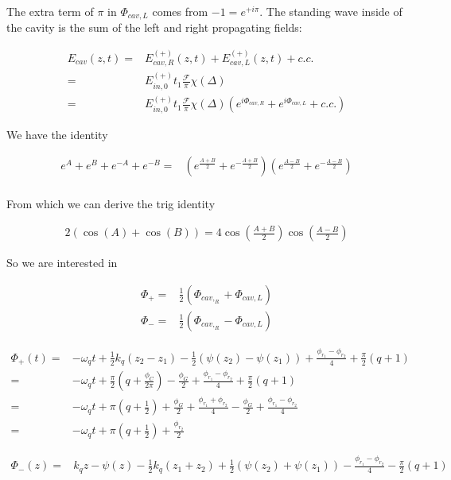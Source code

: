 \documentclass[12pt]{article}
\begin{document}
The extra term of $\pi$ in $\Phi_{cav,L}$ comes from $-1 = e^{+i\pi}$. 
The standing wave inside of the cavity is the sum of the left and right propagating fields:

\begin{align}
E_{cav}(z,t) =& E_{cav,R}^{(+)}(z,t) + E_{cav,L}^{(+)}(z,t) + c.c.\\
=& E_{in,0}^{(+)}t_1\frac{\mathcal{F}}{\pi}\chi(\Delta)\\
=& E_{in,0}^{(+)}t_1\frac{\mathcal{F}}{\pi}\chi(\Delta)\left(e^{i\Phi_{cav,R}} + e^{i\Phi_{cav,L}} + c.c.\right)
\end{align}

We have the identity

\begin{align}
e^A + e^B + e^{-A} + e^{-B} =& \left(e^{\frac{A+B}{2}} + e^{-\frac{A+B}{2}}\right)\left(e^{\frac{A-B}{2}} + e^{-\frac{A-B}{2}}\right)\\
\end{align}

From which we can derive the trig identity

\begin{align}
2(\cos(A) + \cos(B)) = 4\cos\left(\frac{A+B}{2}\right)\cos\left(\frac{A-B}{2}\right)
\end{align}

So we are interested in

\begin{align}
\Phi_+ =& \frac{1}{2}\left(\Phi_{cav,_R} + \Phi_{cav,L}\right)\\
\Phi_- =& \frac{1}{2}\left(\Phi_{cav,_R} - \Phi_{cav,L}\right)
\end{align}

\begin{align}
\Phi_+(t) =& -\omega_q t + \frac{1}{2}k_q(z_2-z_1) - \frac{1}{2}(\psi(z_2)-\psi(z_1)) + \frac{\phi_{r_1} - \phi_{r_2}}{4} + \frac{\pi}{2}(q+1)\\
=& -\omega_q t + \frac{\pi}{2}\left(q + \frac{\phi_C}{2\pi}\right) -\frac{\phi_G}{2} + \frac{\phi_{r_1} - \phi_{r_2}}{4} + \frac{\pi}{2}(q+1)\\
=& -\omega_q t + \pi\left(q+\frac{1}{2}\right) + \frac{\phi_G}{2} + \frac{\phi_{r_1}+\phi_{r_2}}{4} - \frac{\phi_G}{2} + \frac{\phi_{r_1}-\phi_{r_2}}{4}\\
=& -\omega_q t + \pi\left(q+\frac{1}{2}\right) + \frac{\phi_{r_2}}{2}
\end{align}

\begin{align}
\Phi_-(z) =& k_q z -\psi(z) - \frac{1}{2}k_q(z_1 + z_2) + \frac{1}{2}(\psi(z_2) + \psi(z_1)) - \frac{\phi_{r_1} - \phi_{r_2}}{4} - \frac{\pi}{2}(q+1)
\end{align}
\end{document}
